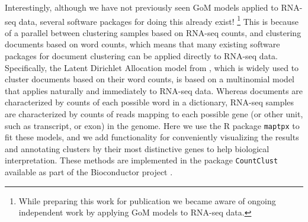 Interestingly, although we have not previously seen GoM models applied to RNA-seq data, several software packages
for doing this already exist! \footnote{While preparing this work for publication we became aware of ongoing independent work
by \cite{duVerle2016} applying GoM models to RNA-seq data.}
 This is because of a parallel between clustering samples based on RNA-seq counts,
 and clustering documents based on word counts, which means that many existing software packages
 for document clustering can be applied directly to RNA-seq data. Specifically, 
 the 
Latent Dirichlet Allocation model from \cite{Blei2003}, which is widely used to cluster documents based on their word counts, 
is based on a multinomial model that applies naturally and immediately to RNA-seq data. 
Whereas documents are characterized by counts of each possible word in a dictionary, RNA-seq samples
are characterized by counts of reads mapping to each possible gene (or other unit, such as transcript, or exon) in the genome. 
Here we use the R package {\tt maptpx} \cite{Taddy2012} to fit these models, and we add functionality for conveniently visualizing the results and annotating
clusters by their most distinctive genes to help biological interpretation. These methods are implemented in the package {\tt CountClust} \cite{Dey2016} available as part of the Bioconductor project \cite{Gentleman2003}.  










